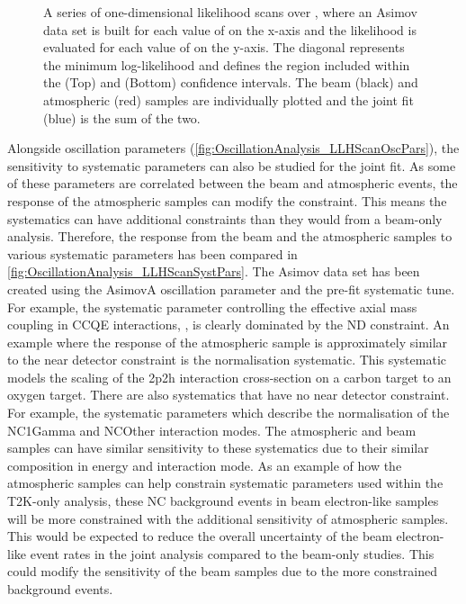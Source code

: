 \begin{figure}[h]
\begin{subfigure}[t]{1.0\textwidth}
  \end{subfigure}
  \caption{A series of one-dimensional likelihood scans over , where an Asimov data set is built for each value of  on the x-axis and the likelihood is evaluated for each value of  on the y-axis. The diagonal represents the minimum log-likelihood and defines the region included within the \quickmath{1\sigma} (Top) and \quickmath{2\sigma} (Bottom) confidence intervals. The beam (black) and atmospheric (red) samples are individually plotted and the joint fit (blue) is the sum of the two.}
  \label{fig:OscillationAnalysis_AsimovEval_TH23}
\end{figure}

\clearpage

Alongside oscillation parameters (\autoref{fig:OscillationAnalysis_LLHScanOscPars}), the sensitivity to systematic parameters can also be studied for the joint fit. As some of these parameters are correlated between the beam and atmospheric events, the response of the atmospheric samples can modify the constraint. This means the systematics can have additional constraints than they would from a beam-only analysis. Therefore, the response from the beam and the atmospheric samples to various systematic parameters has been compared in \autoref{fig:OscillationAnalysis_LLHScanSystPars}. The Asimov data set has been created using the AsimovA oscillation parameter and the pre-fit systematic tune. For example, the systematic parameter controlling the effective axial mass coupling in CCQE interactions, , is clearly dominated by the ND constraint. An example where the response of the atmospheric sample is approximately similar to the near detector constraint is the  normalisation systematic. This systematic models the scaling of the 2p2h interaction cross-section on a carbon target to an oxygen target. There are also systematics that have no near detector constraint. For example, the systematic parameters which describe the normalisation of the NC1Gamma and NCOther interaction modes. The atmospheric and beam samples can have similar sensitivity to these systematics due to their similar composition in energy and interaction mode. As an example of how the atmospheric samples can help constrain systematic parameters used within the T2K-only analysis, these NC background events in beam electron-like samples will be more constrained with the additional sensitivity of atmospheric samples. This would be expected to reduce the overall uncertainty of the beam electron-like event rates in the joint analysis compared to the beam-only studies. This could modify the sensitivity of the beam samples due to the more constrained background events.

